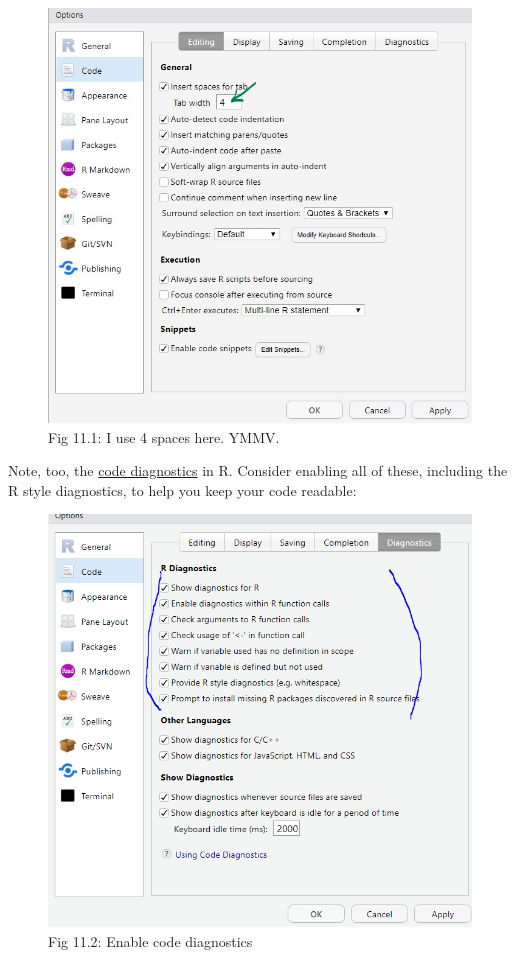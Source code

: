 \documentclass[
]{article}
\begin{document}
\begin{figure}
\centering
\includegraphics{images/RStudioOptions.jpg}
\caption{Fig 11.1: I use 4 spaces here. YMMV.}
\end{figure}

Note, too, the
\href{https://support.rstudio.com/hc/en-us/articles/205753617-Code-Diagnostics}{code
diagnostics} in R. Consider enabling all of these, including the R style
diagnostics, to help you keep your code readable:

\begin{figure}
\centering
\includegraphics{images/codediagnostics.PNG}
\caption{Fig 11.2: Enable code diagnostics}
\end{figure}
\end{document}
